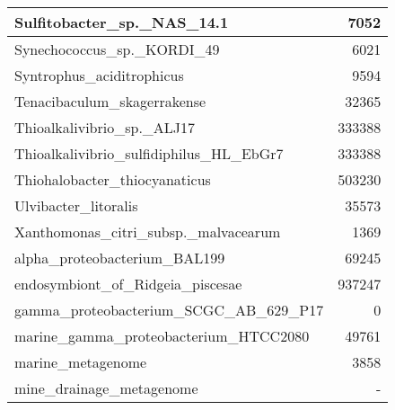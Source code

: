 \documentclass[12pt,a4paper]{article}
\begin{document}
\begin{table}[ht]
\begin{center}
\begin{tabular}{|l*{1}{|r}|}
Sulfitobacter\_sp.\_NAS\_14.1 & 7052 \\ \hline
Synechococcus\_sp.\_KORDI\_49 & 6021 \\ \hline
Syntrophus\_aciditrophicus & 9594 \\ \hline
Tenacibaculum\_skagerrakense & 32365 \\ \hline
Thioalkalivibrio\_sp.\_ALJ17 & 333388 \\ \hline
Thioalkalivibrio\_sulfidiphilus\_HL\_EbGr7 & 333388 \\ \hline
Thiohalobacter\_thiocyanaticus & 503230 \\ \hline
Ulvibacter\_litoralis & 35573 \\ \hline
Xanthomonas\_citri\_subsp.\_malvacearum & 1369 \\ \hline
alpha\_proteobacterium\_BAL199 & 69245 \\ \hline
endosymbiont\_of\_Ridgeia\_piscesae & 937247 \\ \hline
gamma\_proteobacterium\_SCGC\_AB\_629\_P17 & 0 \\ \hline
marine\_gamma\_proteobacterium\_HTCC2080 & 49761 \\ \hline
marine\_metagenome & 3858 \\ \hline
mine\_drainage\_metagenome & - \\ \hline
\end{tabular}
\end{center}
\end{table}
\end{document}
